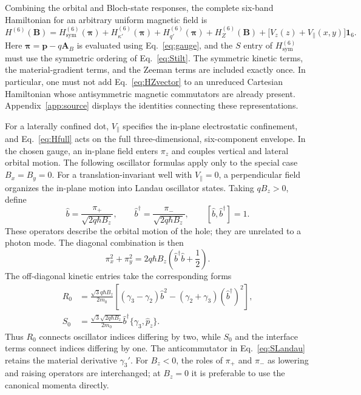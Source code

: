 \documentclass[10pt,letterpaper]{article}
\newcommand{\bb}{\hat b}
\newcommand{\one}{\mathbf 1}
\begin{document}
Combining the orbital and Bloch-state responses, the complete six-band Hamiltonian for an arbitrary uniform magnetic field is
\begin{equation}
\boxed{\displaystyle
H^{(6)}(\bm B)=H_{\mathrm{sym}}^{(6)}(\bm\pi)
+H_{\kappa'}^{(6)}(\bm\pi)+H_{q'}^{(6)}(\bm\pi)
+H_Z^{(6)}(\bm B)
+\bigl[V_z(z)+V_\parallel(x,y)\bigr]\one_6.}
\label{eq:Hfull}
\end{equation}
Here $\bm\pi=\bm p-q\bm A_B$ is evaluated using Eq.~\eqref{eq:gauge}, and the $S$ entry of $H_{\mathrm{sym}}^{(6)}$ must use the symmetric ordering of Eq.~\eqref{eq:Stilt}. The symmetric kinetic terms, the material-gradient terms, and the Zeeman terms are included exactly once. In particular, one must not add Eq.~\eqref{eq:HZvector} to an unreduced Cartesian Hamiltonian whose antisymmetric magnetic commutators are already present. Appendix~\ref{app:source} displays the identities connecting these representations.

For a laterally confined dot, $V_\parallel$ specifies the in-plane electrostatic confinement, and Eq.~\eqref{eq:Hfull} acts on the full three-dimensional, six-component envelope. In the chosen gauge, an in-plane field enters $\pi_z$ and couples vertical and lateral orbital motion. The following oscillator formulas apply only to the special case $B_x=B_y=0$. For a translation-invariant well with $V_\parallel=0$, a perpendicular field organizes the in-plane motion into Landau oscillator states. Taking $qB_z>0$, define
\begin{equation}
\bb=\frac{\pi_+}{\sqrt{2q\hbar B_z}},\qquad
\bb^\dagger=\frac{\pi_-}{\sqrt{2q\hbar B_z}},\qquad
[\bb,\bb^\dagger]=1.
\label{eq:ladder}
\end{equation}
These operators describe the orbital motion of the hole; they are unrelated to a photon mode. The diagonal combination is then
\begin{equation}
\pi_x^2+\pi_y^2=2q\hbar B_z
\left(\bb^\dagger\bb+\frac12\right).
\label{eq:Landau}
\end{equation}
The off-diagonal kinetic entries take the corresponding forms
\begin{align}
R_0&=\frac{\sqrt3q\hbar B_z}{2m_0}
\left[(\gamma_3-\gamma_2)\bb^2
-(\gamma_2+\gamma_3)(\bb^\dagger)^2\right],\label{eq:RLandau}\\
S_0&=\frac{\sqrt3\sqrt{2q\hbar B_z}}{2m_0}
\bb^\dagger\{\gamma_3, \hat{p}_ z\}.
\label{eq:SLandau}
\end{align}
Thus $R_0$ connects oscillator indices differing by two, while $S_0$ and the interface terms connect indices differing by one. The anticommutator in Eq.~\eqref{eq:SLandau} retains the material derivative $\gamma_3'$. For $B_z<0$, the roles of $\pi_+$ and $\pi_-$ as lowering and raising operators are interchanged; at $B_z=0$ it is preferable to use the canonical momenta directly.
\end{document}
